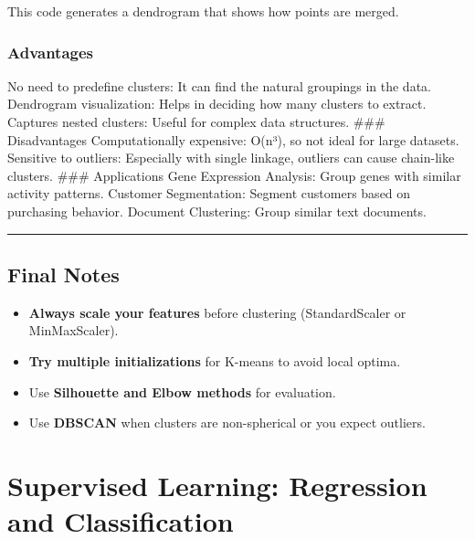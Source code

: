 \documentclass[
  letterpaper,
  DIV=11,
  numbers=noendperiod]{scrreprt}
\providecommand{\tightlist}{%
  \setlength{\itemsep}{0pt}\setlength{\parskip}{0pt}}\usepackage{longtable,booktabs,array}
\begin{document}
This code generates a dendrogram that shows how points are merged.

\subsection{Advantages}\label{advantages}

No need to predefine clusters: It can find the natural groupings in the
data. Dendrogram visualization: Helps in deciding how many clusters to
extract. Captures nested clusters: Useful for complex data structures.
\#\#\# Disadvantages Computationally expensive: O(n³), so not ideal for
large datasets. Sensitive to outliers: Especially with single linkage,
outliers can cause chain-like clusters. \#\#\# Applications Gene
Expression Analysis: Group genes with similar activity patterns.
Customer Segmentation: Segment customers based on purchasing behavior.
Document Clustering: Group similar text documents.

\begin{center}\rule{0.5\linewidth}{0.5pt}\end{center}

\section{Final Notes}\label{final-notes}

\begin{itemize}
\tightlist
\item
  \textbf{Always scale your features} before clustering (StandardScaler
  or MinMaxScaler).
\item
  \textbf{Try multiple initializations} for K-means to avoid local
  optima.
\item
  Use \textbf{Silhouette and Elbow methods} for evaluation.
\item
  Use \textbf{DBSCAN} when clusters are non-spherical or you expect
  outliers.
\end{itemize}


\chapter{Supervised Learning: Regression and
Classification}\label{supervised-learning-regression-and-classification}
\end{document}
